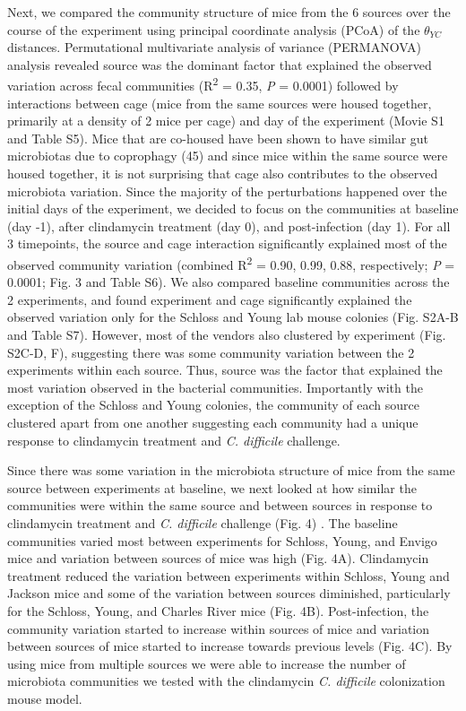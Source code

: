 \documentclass[11pt,]{article}
\begin{document}
Next, we compared the community structure of mice from the 6 sources
over the course of the experiment using principal coordinate analysis
(PCoA) of the \(\theta_{YC}\) distances. Permutational multivariate
analysis of variance (PERMANOVA) analysis revealed source was the
dominant factor that explained the observed variation across fecal
communities (R\textsuperscript{2} = 0.35, \emph{P} = 0.0001) followed by
interactions between cage (mice from the same sources were housed
together, primarily at a density of 2 mice per cage) and day of the
experiment (Movie S1 and Table S5). Mice that are co-housed have been
shown to have similar gut microbiotas due to coprophagy (45) and since
mice within the same source were housed together, it is not surprising
that cage also contributes to the observed microbiota variation. Since
the majority of the perturbations happened over the initial days of the
experiment, we decided to focus on the communities at baseline (day -1),
after clindamycin treatment (day 0), and post-infection (day 1). For all
3 timepoints, the source and cage interaction significantly explained
most of the observed community variation (combined R\textsuperscript{2}
= 0.90, 0.99, 0.88, respectively; \emph{P} = 0.0001; Fig. 3 and Table
S6). We also compared baseline communities across the 2 experiments, and
found experiment and cage significantly explained the observed variation
only for the Schloss and Young lab mouse colonies (Fig. S2A-B and Table
S7). However, most of the vendors also clustered by experiment (Fig.
S2C-D, F), suggesting there was some community variation between the 2
experiments within each source. Thus, source was the factor that
explained the most variation observed in the bacterial communities.
Importantly with the exception of the Schloss and Young colonies, the
community of each source clustered apart from one another suggesting
each community had a unique response to clindamycin treatment and
\emph{C. difficile} challenge.

Since there was some variation in the microbiota structure of mice from
the same source between experiments at baseline, we next looked at how
similar the communities were within the same source and between sources
in response to clindamycin treatment and \emph{C. difficile} challenge
(Fig. 4) . The baseline communities varied most between experiments for
Schloss, Young, and Envigo mice and variation between sources of mice
was high (Fig. 4A). Clindamycin treatment reduced the variation between
experiments within Schloss, Young and Jackson mice and some of the
variation between sources diminished, particularly for the Schloss,
Young, and Charles River mice (Fig. 4B). Post-infection, the community
variation started to increase within sources of mice and variation
between sources of mice started to increase towards previous levels
(Fig. 4C). By using mice from multiple sources we were able to increase
the number of microbiota communities we tested with the clindamycin
\emph{C. difficile} colonization mouse model.
\end{document}
